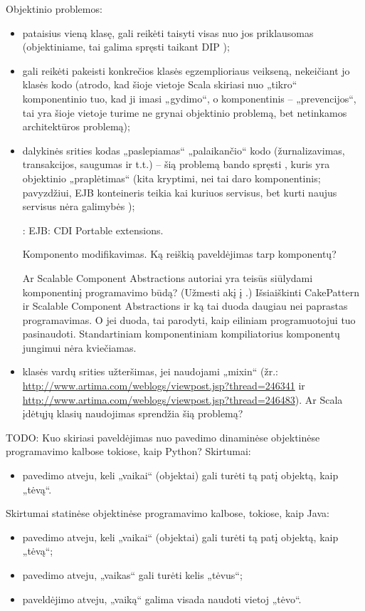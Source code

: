 Objektinio problemos:
\begin{itemize}
  \item pataisius vieną klasę, gali reikėti taisyti visas nuo jos
    priklausomas (objektiniame, tai galima spręsti taikant DIP
    );
  \item gali reikėti pakeisti konkrečios klasės egzemplioriaus veikseną,
    nekeičiant jo klasės kodo (atrodo, kad šioje vietoje Scala skiriasi
    nuo „tikro“ komponentinio tuo, kad ji imasi „gydimo“, o komponentinis
    – „prevencijos“, tai yra šioje vietoje turime ne grynai objektinio
    problemą, bet netinkamos architektūros problemą);
  \item dalykinės srities kodas „paslepiamas“ „palaikančio“ kodo
    (žurnalizavimas, transakcijos, saugumas ir t.t.) – šią problemą
    bando spręsti , kuris yra objektinio
    „praplėtimas“ (kita kryptimi, nei tai daro komponentinis; pavyzdžiui,
    EJB konteineris teikia kai kuriuos servisus, bet kurti naujus
    servisus nėra galimybės \cite[285]{mastering-EJB});

    \TODO: EJB: CDI Portable extensions.

    \TODO Komponento modifikavimas. Ką reiškią paveldėjimas tarp
    komponentų?

    \TODO Ar Scalable Component Abstractions autoriai yra teisūs
    siūlydami komponentinį programavimo būdą? (Užmesti akį į
    \cite{odersky:scala-experiment}.) Išsiaiškinti CakePattern
    ir Scalable Component Abstractions ir ką tai duoda daugiau
    nei paprastas programavimas. O jei duoda, tai parodyti, kaip
    eiliniam programuotojui tuo pasinaudoti.
    Standartiniam komponentiniam kompiliatorius komponentų jungimui nėra
    kviečiamas.

  \item klasės vardų srities užteršimas, jei naudojami „mixin“
    (žr.: \url{http://www.artima.com/weblogs/viewpost.jsp?thread=246341}
    ir \url{http://www.artima.com/weblogs/viewpost.jsp?thread=246483}).
    Ar Scala įdėtųjų  klasių naudojimas sprendžia šią problemą?
\end{itemize}


TODO: Kuo skiriasi paveldėjimas nuo pavedimo dinaminėse objektinėse
programavimo kalbose tokiose, kaip Python? Skirtumai:
\begin{itemize}
  \item pavedimo atveju, keli „vaikai“ (objektai) gali turėti tą
    patį objektą, kaip „tėvą“.
\end{itemize}
Skirtumai statinėse objektinėse programavimo kalbose, tokiose, kaip
Java:
\begin{itemize}
  \item pavedimo atveju, keli „vaikai“ (objektai) gali turėti tą
    patį objektą, kaip „tėvą“;
  \item pavedimo atveju, „vaikas“ gali turėti kelis „tėvus“;
  \item paveldėjimo atveju, „vaiką“ galima visada naudoti vietoj „tėvo“.
\end{itemize}


